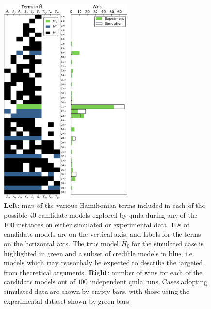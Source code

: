 \begin{figure}
    \begin{center}
        \includegraphics[width=0.6\textwidth]{experimental_study/figures/model_composition.pdf}
    \end{center}
    \caption[
        Models considered by \gls{qmla} for simulated/experimental  data, and their  \glspl{win rate}
    ]{
    \textbf{Left}: map of the various Hamiltonian terms included in each of the possible 40 candidate models explored by \gls{qmla}
    during any of the 100 \glspl{instance} on either simulated or experimental data.
    IDs of candidate models are on the vertical axis, and labels for the terms on the horizontal axis.
    The \gls{true model} $\hat{H}_0$ for the simulated case is highlighted in green and a subset of credible models in blue, 
    i.e. models which may reasonbaly be expected to describe the targeted  from theoretical arguments.
    \textbf{Right}: number of wins for each of the candidate models out of $100$ independent \gls{qmla} \glspl{run}. 
    Cases adopting simulated data are shown by empty bars, with those using the experimental dataset shown by green bars.
    \figtableref
    } 
    \label{fig:nv_model_composition}
\end{figure}

